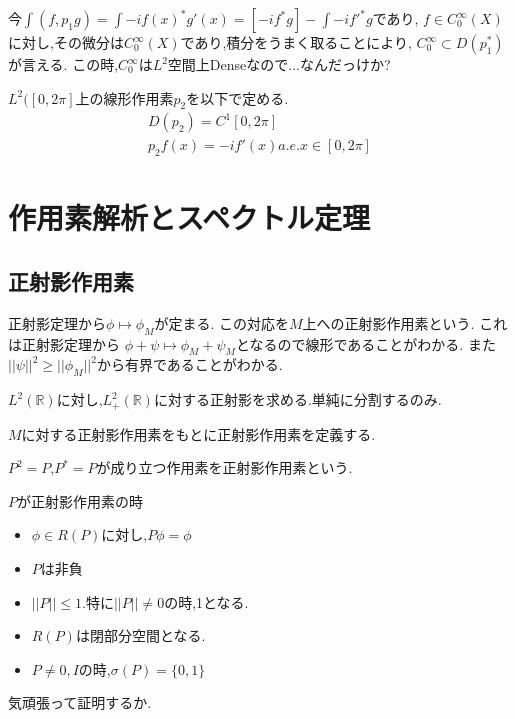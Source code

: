 \documentclass[uplatex]{jsbook}
\begin{document}
今$ \int (f, p_1g) = \int -if(x)^* g'(x) = [-i f^*g] - \int -i f'^* g$であり,
$f \in C_0^{\infty}(X)$に対し,その微分は$C_0^{\infty}(X)$であり,積分をうまく取ることにより,
$C_{0}^{\infty} \subset D(p_1^*)$が言える.
この時,$C_0^{\infty}$は$L^2$空間上Denseなので...なんだっけか?


\begin{epl}
  $L^2([0, 2\pi]$上の線形作用素$p_2$を以下で定める.
  \begin{align*}
  D(p_2) = C^1[0, 2\pi] \\
  p_2f(x) = - i f'(x) a.e . x \in [0, 2\pi]
  \end{align*}
\end{epl}






\chapter{作用素解析とスペクトル定理}

\section{正射影作用素}
正射影定理から$\phi \mapsto \phi_M$が定まる.
この対応を$M$上への正射影作用素という.
これは正射影定理から
$\phi + \psi \mapsto \phi_M + \psi_M$となるので線形であることがわかる.
また$||\psi||^2 \ge ||\phi_M||^2$から有界であることがわかる.

\begin{epl}
  $L^2(\mathbb{R})$に対し,$L^2_+(\mathbb{R})$に対する正射影を求める.単純に分割するのみ.
\end{epl}

$M$に対する正射影作用素をもとに正射影作用素を定義する.
\begin{screen}
\begin{dfn}
 $P^2 = P$,$P^* = P$が成り立つ作用素を正射影作用素という.
\end{dfn}
\end{screen}

\begin{prop}
$P$が正射影作用素の時
 \begin{itemize}
   \item $\phi \in R(P)$に対し,$P\phi = \phi$
   \item $P$は非負
   \item $||P|| \le 1$.特に$||P|| \neq 0$の時,1となる.
   \item $R(P)$は閉部分空間となる.
   \item $P \neq 0, I$の時,$\sigma(P) = \{0, 1\}$
 \end{itemize}
\end{prop}
気頑張って証明するか.
\end{document}
